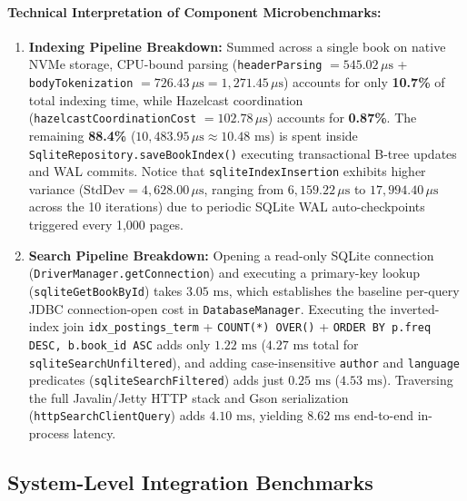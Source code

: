 \documentclass[10pt,a4paper]{article}
\begin{document}
\paragraph{Technical Interpretation of Component Microbenchmarks:}
\begin{enumerate}[leftmargin=*,nosep]
    \item \textbf{Indexing Pipeline Breakdown:} Summed across a single book on native NVMe storage, CPU-bound parsing (\texttt{headerParsing} $= 545.02\,\mu\text{s}$ + \texttt{bodyTokenization} $= 726.43\,\mu\text{s} = 1,271.45\,\mu\text{s}$) accounts for only \textbf{10.7\%} of total indexing time, while Hazelcast coordination (\texttt{hazelcastCoordinationCost} $= 102.78\,\mu\text{s}$) accounts for \textbf{0.87\%}. The remaining \textbf{88.4\%} ($10,483.95\,\mu\text{s} \approx 10.48\text{ ms}$) is spent inside \texttt{SqliteRepository.saveBookIndex()} executing transactional B-tree updates and WAL commits. Notice that \texttt{sqliteIndexInsertion} exhibits higher variance ($\text{StdDev} = 4,628.00\,\mu\text{s}$, ranging from $6,159.22\,\mu\text{s}$ to $17,994.40\,\mu\text{s}$ across the 10 iterations) due to periodic SQLite WAL auto-checkpoints triggered every 1,000 pages.
    \item \textbf{Search Pipeline Breakdown:} Opening a read-only SQLite connection (\texttt{DriverManager.getConnection}) and executing a primary-key lookup (\texttt{sqliteGetBookById}) takes $3.05\text{ ms}$, which establishes the baseline per-query JDBC connection-open cost in \texttt{DatabaseManager}. Executing the inverted-index join \texttt{idx\_postings\_term} + \texttt{COUNT(*) OVER()} + \texttt{ORDER BY p.freq DESC, b.book\_id ASC} adds only $1.22\text{ ms}$ ($4.27\text{ ms}$ total for \texttt{sqliteSearchUnfiltered}), and adding case-insensitive \texttt{author} and \texttt{language} predicates (\texttt{sqliteSearchFiltered}) adds just $0.25\text{ ms}$ ($4.53\text{ ms}$). Traversing the full Javalin/Jetty HTTP stack and Gson serialization (\texttt{httpSearchClientQuery}) adds $4.10\text{ ms}$, yielding $8.62\text{ ms}$ end-to-end in-process latency.
\end{enumerate}

\subsection{System-Level Integration Benchmarks}
\label{subsec:system_results}
\end{document}
